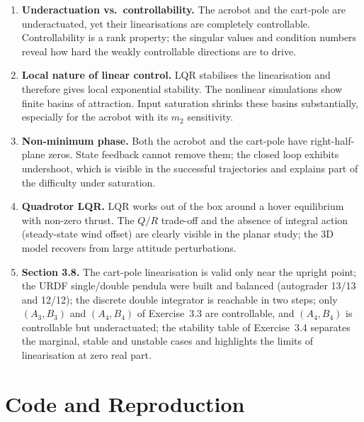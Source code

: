 \documentclass[11pt]{article}
\begin{document}
\begin{enumerate}[leftmargin=1.4em]
  \item \textbf{Underactuation vs.\ controllability.}  The acrobot and the
        cart-pole are underactuated, yet their linearisations are completely
        controllable.  Controllability is a rank property; the singular values
        and condition numbers reveal how hard the weakly controllable
        directions are to drive.
  \item \textbf{Local nature of linear control.}  LQR stabilises the
        linearisation and therefore gives local exponential stability.  The
        nonlinear simulations show finite basins of attraction.  Input
        saturation shrinks these basins substantially, especially for the
        acrobot with its $m_2$ sensitivity.
  \item \textbf{Non-minimum phase.}  Both the acrobot and the cart-pole have
        right-half-plane zeros.  State feedback cannot remove them; the closed
        loop exhibits undershoot, which is visible in the successful
        trajectories and explains part of the difficulty under saturation.
  \item \textbf{Quadrotor LQR.}  LQR works out of the box around a hover
        equilibrium with non-zero thrust.  The $Q/R$ trade-off and the absence
        of integral action (steady-state wind offset) are clearly visible in
        the planar study; the 3D model recovers from large attitude
        perturbations.
  \item \textbf{Section 3.8.}  The cart-pole linearisation is valid only near
        the upright point; the URDF single/double pendula were built and
        balanced (autograder 13/13 and 12/12); the discrete double integrator
        is reachable in two steps; only $(A_3,B_3)$ and $(A_4,B_4)$ of
        Exercise~3.3 are controllable, and $(A_4,B_4)$ is controllable but
        underactuated; the stability table of Exercise~3.4 separates the
        marginal, stable and unstable cases and highlights the limits of
        linearisation at zero real part.
\end{enumerate}

\section{Code and Reproduction}\label{sec:repro}
\end{document}
